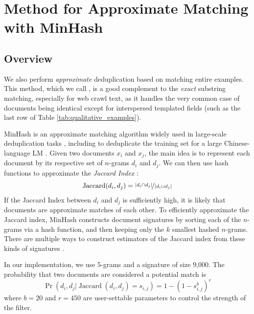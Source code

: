 \section{Method for Approximate Matching with MinHash} \label{sec:approx}

\subsection{Overview}

We also perform \emph{approximate} deduplication based on matching entire examples.
This method, which we call \Approx, is a good complement to the \emph{exact} substring matching, especially for web crawl text, as it handles the very common case of documents being identical except for interspersed templated fields (such as the last row of Table \ref{tab:qualitative_examples}).

MinHash \citep{broder1997resemblance} is an approximate matching algorithm widely used in large-scale deduplication tasks \citep{versley2012not,GABRIEL201863,gyawali2020deduplication}, including to deduplicate the training set for a large Chinese-language LM \citep{zeng2021pangualpha}.
Given two documents $x_i$ and $x_j$, the main idea is to represent each document by its respective set of $n$-grams $d_i$ and $d_j$.
We can then use hash functions to approximate the \emph{Jaccard Index} \citep{jaccard1912distribution}:
\begin{equation}
\operatorname{Jaccard}(d_i, d_j) = \nicefrac{|d_i \cap d_j|}{|d_i \cup d_j|}
\end{equation}
If the Jaccard Index between $d_i$ and $d_j$ is sufficiently high, it is likely that documents are approximate matches of each other.
To efficiently approximate the Jaccard index, MinHash constructs document signatures by sorting each of the $n$-grams via a hash function, and then keeping only the $k$ smallest hashed $n$-grams.
There are multiple ways to construct estimators of the Jaccard index from these kinds of signatures \citep{cohen2016min}.

In our implementation, we use 5-grams and a signature of size 9,000. The probability that two documents are considered a potential match is
\begin{equation}
\operatorname{Pr}(d_i, d_j | \operatorname{Jaccard}(d_i, d_j) = s_{i, j}) = 1 - (1 - s_{i, j}^b)^r
\end{equation}
where $b=20$ and $r=450$ are user-settable parameters to control the strength of the filter.

